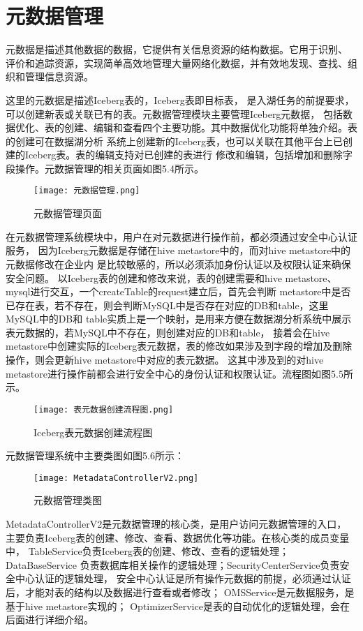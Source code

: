 \section{元数据管理}

元数据是描述其他数据的数据，它提供有关信息资源的结构数据。它用于识别、
评价和追踪资源，实现简单高效地管理大量网络化数据，并有效地发现、查找、组织和管理信息资源。

这里的元数据是描述Iceberg表的，Iceberg表即目标表，
是入湖任务的前提要求，可以创建新表或关联已有的表。元数据管理模块主要管理Iceberg元数据，
包括数据优化、表的创建、编辑和查看四个主要功能。其中数据优化功能将单独介绍。表的创建可在数据湖分析
系统上创建新的Iceberg表，也可以关联在其他平台上已创建的Iceberg表。表的编辑支持对已创建的表进行
修改和编辑，包括增加和删除字段操作。元数据管理的相关页面如图5.4所示。

\begin{figure}[h]
  \centering
  \texttt{[image: 元数据管理.png]}
  \caption{元数据管理页面}
  \label{fig:badge}
\end{figure}

在元数据管理系统模块中，用户在对元数据进行操作前，都必须通过安全中心认证服务，
因为Iceberg元数据是存储在hive metastore中的，而对hive metastore中的元数据修改在企业内
是比较敏感的，所以必须添加身份认证以及权限认证来确保安全问题。
以Iceberg表的创建和修改来说，表的创建需要和hive metastore、mysql进行交互，一个createTable的request建立后，首先会判断
metastore中是否已存在表，若不存在，则会判断MySQL中是否存在对应的DB和table，这里MySQL中的DB和
table实质上是一个映射，是用来方便在数据湖分析系统中展示表元数据的，若MySQL中不存在，则创建对应的DB和table，
接着会在hive metastore中创建实际的Iceberg表元数据，表的修改如果涉及到字段的增加及删除操作，则会更新hive metastore中对应的表元数据。
这其中涉及到的对hive metastore进行操作前都会进行安全中心的身份认证和权限认证。流程图如图5.5所示。

\begin{figure}[h]
  \centering
  \texttt{[image: 表元数据创建流程图.png]}
  \caption{Iceberg表元数据创建流程图}
  \label{fig:badge}
\end{figure}

元数据管理系统中主要类图如图5.6所示：

\begin{figure}[h]
  \centering
  \texttt{[image: MetadataControllerV2.png]}
  \caption{元数据管理类图}
  \label{fig:badge}
\end{figure}

MetadataControllerV2是元数据管理的核心类，是用户访问元数据管理的入口，
主要负责Iceberg表的创建、修改、查看、数据优化等功能。在核心类的成员变量中，
TableService负责Iceberg表的创建、修改、查看的逻辑处理；DataBaseService
负责数据库相关操作的逻辑处理；SecurityCenterService负责安全中心认证的逻辑处理，
安全中心认证是所有操作元数据的前提，必须通过认证后，才能对表的结构以及数据进行查看或者修改；
OMSService是元数据服务，是基于hive metastore实现的；
OptimizerService是表的自动优化的逻辑处理，会在后面进行详细介绍。


